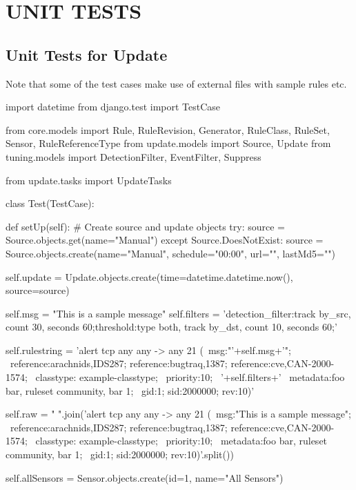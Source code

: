 \chapter{UNIT TESTS}
\label{app:unit_tests}

\section{Unit Tests for Update}
Note that some of the test cases make use of external files with sample rules
etc.

\begin{python}[breaklines=true]
import datetime
from django.test import TestCase

from core.models import Rule, RuleRevision, Generator, RuleClass, RuleSet, Sensor, RuleReferenceType
from update.models import Source, Update
from tuning.models import DetectionFilter, EventFilter, Suppress

from update.tasks import UpdateTasks

class Test(TestCase):

  def setUp(self):
    # Create source and update objects
    try:
      source = Source.objects.get(name="Manual")
    except Source.DoesNotExist:
      source = Source.objects.create(name="Manual", schedule="00:00", url="", lastMd5="")

    self.update = Update.objects.create(time=datetime.datetime.now(), source=source)
    
    self.msg = "This is a sample message"
    self.filters = 'detection_filter:track by_src, count 30, seconds 60;threshold:type both, track by_dst, count 10, seconds 60;'
    
    self.rulestring = 'alert tcp any any -> any 21 (\
            msg:"'+self.msg+'"; \
            reference:arachnids,IDS287; reference:bugtraq,1387; reference:cve,CAN-2000-1574; \
            classtype: example-classtype; \
            priority:10; \
            '+self.filters+' \
            metadata:foo bar, ruleset community, bar 1; \
            gid:1; sid:2000000; rev:10)'
            
    self.raw = " ".join('alert tcp any any -> any 21 (\
            msg:"This is a sample message"; \
            reference:arachnids,IDS287; reference:bugtraq,1387; reference:cve,CAN-2000-1574; \
            classtype: example-classtype; \
            priority:10; \
            metadata:foo bar, ruleset community, bar 1; \
            gid:1; sid:2000000; rev:10)'.split())
    
    self.allSensors = Sensor.objects.create(id=1, name="All Sensors")
        

\end{python}
